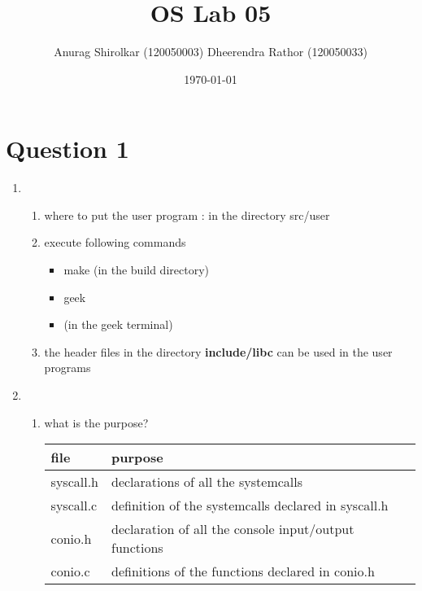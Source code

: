 \documentclass[11pt]{article}
\title{OS Lab 05}
\author{Anurag Shirolkar (120050003) Dheerendra Rathor (120050033)}
\date{\today}
\begin{document}
\maketitle

\setcounter{tocdepth}{3}
\tableofcontents
\vspace*{1cm}
\section{Question 1}
\label{sec-1}

\begin{enumerate}
\item 
\begin{enumerate}
\item where to put the user program : in the directory src/user
\item execute following commands
\begin{itemize}
\item make (in the build directory)
\item geek
\item <name of the program> (in the geek terminal)
\end{itemize}
\item the header files in the directory \textbf{include/libc} can be used in the user programs
\end{enumerate}
\item 
\begin{enumerate}
\item what is the purpose?

\begin{center}
\begin{tabular}{ll}
 file       &  purpose                                                \\
\hline
 syscall.h  &  declarations of all the systemcalls                    \\
 syscall.c  &  definition of the systemcalls declared in syscall.h    \\
 conio.h    &  declaration of all the console input/output functions  \\
 conio.c    &  definitions of the functions declared in conio.h       \\
\end{tabular}
\end{center}



\end{enumerate}
\end{enumerate}
\end{document}

